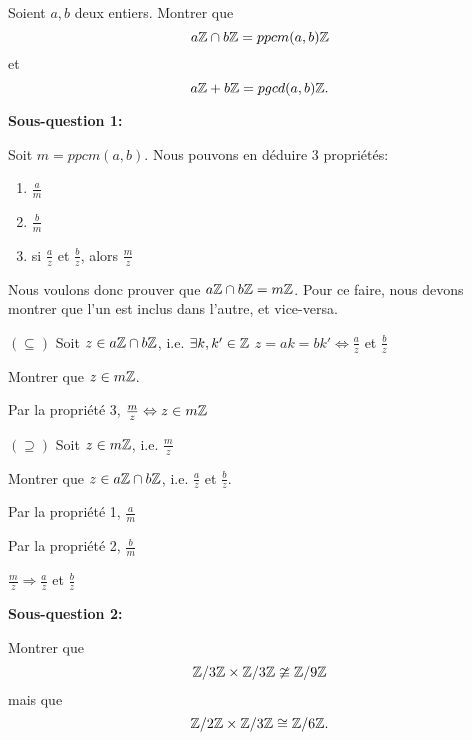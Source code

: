 
\vspace*{0.8cm}
\begin{exo}
Soient $a,b$ deux entiers. Montrer que $$a\mathbb{Z} \cap b\mathbb{Z} = ppcm(a,b)\mathbb{Z}$$ et $$ a\mathbb{Z} + b\mathbb{Z} = pgcd(a,b)\mathbb{Z}.$$
\end{exo}

\textbf{Sous-question 1:} 

Soit $m = ppcm(a,b)$. Nous pouvons en déduire 3 propriétés:

\begin{enumerate}
	\item $\frac{a}{m}$
	\item $\frac{b}{m}$
	\item si $\frac{a}{z}$ et $\frac{b}{z}$, alors $\frac{m}{z}$ 
\end{enumerate}

Nous voulons donc prouver que $a\mathbb{Z} \cap b\mathbb{Z} = m\mathbb{Z}$. Pour ce faire, nous devons montrer que l'un est inclus dans l'autre, et vice-versa. 

$(\subseteq)$ Soit $z \in a\mathbb{Z} \cap b\mathbb{Z} $, i.e. $\exists k,{k}' \in \mathbb{Z} $ \hspace{1cm} $z = ak = b{k}' \Leftrightarrow \frac{a}{z}$ et $\frac{b}{z}$ 

Montrer que $z \in m\mathbb{Z}$. 

Par la propriété 3, $\frac{m}{z} \Leftrightarrow z \in m\mathbb{Z}$ 

$(\supseteq)$ Soit $z \in m\mathbb{Z} $, i.e. $\frac{m}{z}$ 

Montrer que $z \in a\mathbb{Z} \cap b\mathbb{Z}$, i.e. $\frac{a}{z}$ et $\frac{b}{z}$. 

\begin{minipage}{.5\textwidth}
	Par la propriété 1, $\frac{a}{m}$

	Par la propriété 2, $\frac{b}{m}$
\end{minipage}
\begin{minipage}{.5\textwidth}
	$\frac{m}{z} \Rightarrow \frac{a}{z}$ et $\frac{b}{z}$ 
\end{minipage}

\vspace*{0.3cm}

\textbf{Sous-question 2:} 

\vspace*{0.8cm}


\begin{exo}
Montrer que $$\mathbb{Z}/3\mathbb{Z} \times \mathbb{Z}/3\mathbb{Z} \ncong \mathbb{Z}/9\mathbb{Z}$$ mais que $$\mathbb{Z}/2\mathbb{Z} \times \mathbb{Z}/3\mathbb{Z} \cong \mathbb{Z}/6\mathbb{Z}.$$

\end{exo}